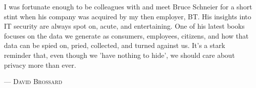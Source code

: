 I was fortunate enough to be colleagues with and meet Bruce Schneier for a short stint when his company was acquired by my then employer, BT. His insights into IT security are always spot on, acute, and entertaining. One of his latest books focuses on the data we generate as consumers, employees, citizens, and how that data can be spied on, pried, collected, and turned against us. It's a stark reminder that, even though we 'have nothing to hide', we should care about privacy more than ever.
\setlength{\parindent}{0cm}\par\textsc{ --- David Brossard }\par\vspace{12pt}\setlength{\parindent}{15pt}

